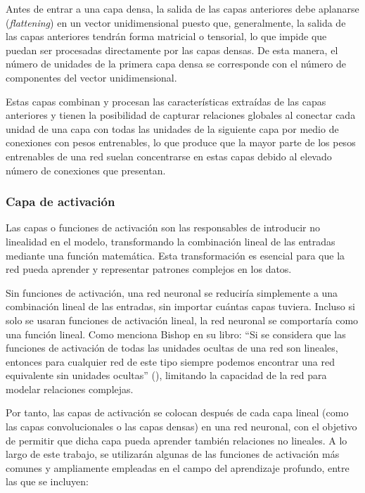 Antes de entrar a una capa densa, la salida de las capas anteriores debe aplanarse (\emph{flattening}) en un vector unidimensional puesto que, generalmente, la salida de las capas anteriores tendrán forma matricial o tensorial, lo que impide que puedan ser procesadas directamente por las capas densas. De esta manera, el número de unidades de la primera capa densa se corresponde con el número de componentes del vector unidimensional.\newline

Estas capas combinan y procesan las características extraídas de las capas anteriores y tienen la posibilidad de capturar relaciones globales al conectar cada unidad de una capa con todas las unidades de la siguiente capa por medio de conexiones con pesos entrenables, lo que produce que la mayor parte de los pesos entrenables de una red suelan concentrarse en estas capas debido al elevado número de conexiones que presentan.\newline

\subsubsection{Capa de activación}

Las capas o funciones de activación son las responsables de introducir no linealidad en el modelo, transformando la combinación lineal de las entradas mediante una función matemática. Esta transformación es esencial para que la red pueda aprender y representar patrones complejos en los datos.\newline

Sin funciones de activación, una red neuronal se reduciría simplemente a una combinación lineal de las entradas, sin importar cuántas capas tuviera. Incluso si solo se usaran funciones de activación lineal, la red neuronal se comportaría como una función lineal. Como menciona Bishop en su libro: ``Si se considera que las funciones de activación de todas las unidades ocultas de una red son lineales, entonces para cualquier red de este tipo siempre podemos encontrar una red equivalente sin unidades ocultas'' (\cite{Bishop2006}), limitando la capacidad de la red para modelar relaciones complejas.\newline

Por tanto, las capas de activación se colocan después de cada capa lineal (como las capas convolucionales o las capas densas) en una red neuronal, con el objetivo de permitir que dicha capa pueda aprender también relaciones no lineales. A lo largo de este trabajo, se utilizarán algunas de las funciones de activación más comunes y ampliamente empleadas en el campo del aprendizaje profundo, entre las que se incluyen:

